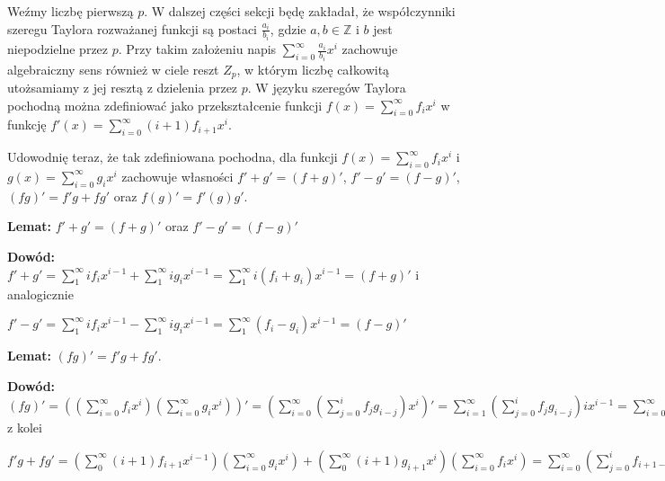 \documentclass{article}
\begin{document}
Weźmy liczbę pierwszą $p$. W dalszej części sekcji będę zakładał, że współczynniki szeregu Taylora 
rozważanej funkcji są postaci 
$\frac{a_i}{b_i}$, gdzie $a,b \in \mathbb{Z}$ i  $b$ jest niepodzielne przez $p$. Przy takim założeniu napis  
$\sum_{i=0}^{\infty}\frac{a_i}{b_i}x^i$ zachowuje algebraiczny sens również w ciele reszt $Z_p$, w którym 
liczbę całkowitą utożsamiamy z jej resztą z dzielenia przez $p$. W języku szeregów Taylora pochodną można 
zdefiniować jako przekształcenie funkcji $f(x)=\sum_{i=0}^\infty f_ix^i$ w funkcję 
$f '(x)=\sum_{i=0}^{\infty}(i+1)f_{i+1}x^i$. 

Udowodnię teraz, że tak zdefiniowana pochodna, dla funkcji $f(x)=\sum_{i=0}^{\infty}f_ix^i$ i
$g(x)=\sum_{i=0}^{\infty}g_ix^i$ zachowuje własności $f'+g'=(f+g)'$, $f'-g'=(f-g)'$, $(fg)'=f'g+fg'$ oraz 
$f(g)'=f'(g)g'$.

\begin{tcolorbox}
    \textbf{Lemat:} $f'+g'=(f+g)'$ oraz $f'-g'=(f-g)'$
    
    \textbf{Dowód:} $f'+g'=\sum_{1}^{\infty}if_ix^{i-1}+\sum_{1}^{\infty}ig_ix^{i-1}=
    \sum_{1}^{\infty}i(f_i+g_i)x^{i-1}=(f+g)'$ i analogicznie
    
    $f'-g'=\sum_{1}^{\infty}if_ix^{i-1}-\sum_{1}^{\infty}ig_ix^{i-1}=
    \sum_{1}^{\infty}(f_i-g_i)x^{i-1}=(f-g)'$ 
\end{tcolorbox}

\begin{tcolorbox}
    \textbf{Lemat:} $(fg)'=f'g+fg'$.
    
    \textbf{Dowód:} $(fg)'=((\sum_{i=0}^{\infty}f_ix^i)(\sum_{i=0}^{\infty}g_ix^i))'=
    (\sum_{i=0}^{\infty}(\sum_{j=0}^if_jg_{i-j})x^i)'=
    \sum_{i=1}^{\infty}(\sum_{j=0}^if_jg_{i-j})ix^{i-1}=
    \sum_{i=0}^{\infty}(\sum_{j=0}^if_jg_{i+1-j})(i+1)x^{i}$ z kolei

    $f'g+fg'=(\sum_{0}^{\infty}(i+1)f_{i+1}x^{i-1})(\sum_{i=0}^{\infty}g_ix^i)+(\sum_{0}^{\infty}(i+1)g_{i+1}x^{i})(\sum_{i=0}^{\infty}f_ix^i)=
    \sum_{i=0}^\infty(\sum_{j=0}^{i}f_{i+1-j}g_{j}(i+1-j))x^i+
    \sum_{i=0}^\infty(\sum_{j=0}^{i}g_{i+1-j}f_{j}(i+1-j))x^i=
    \sum_{i=0}^\infty(\sum_{j=0}^{i}g_{i+1-j}f_{j}(i+1-j+j))x^i=
    \sum_{i=0}^\infty(\sum_{j=0}^{i}g_{i+1-j}f_{j})(i+1)x^i=(fg)'
    $
\end{tcolorbox}
\end{document}
